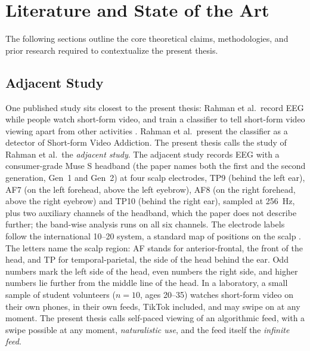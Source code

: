 \documentclass[12pt,a4paper]{report}
\begin{document}
\chapter{Literature and State of the Art}
\label{chap:literature}

The following sections outline the core theoretical claims, methodologies, and prior research required to contextualize the present thesis. 


\section{Adjacent Study}
\label{sec:adjacent_studies}
One published study sits closest to the present thesis: Rahman et al.\ record EEG while people watch short-form video, and train a classifier to tell short-form video viewing apart from other activities \cite{rahman_detection_2025}. Rahman et al.\ present the classifier as a detector of Short-form Video Addiction. The present thesis calls the study of Rahman et al.\ the \emph{adjacent study}. The adjacent study records EEG with a consumer-grade Muse S headband (the paper names both the first and the second generation, Gen~1 and Gen~2) at four scalp electrodes, TP9 (behind the left ear), AF7 (on the left forehead, above the left eyebrow), AF8 (on the right forehead, above the right eyebrow) and TP10 (behind the right ear), sampled at 256~Hz, plus two auxiliary channels of the headband, which the paper does not describe further; the band-wise analysis runs on all six channels. The electrode labels follow the international 10--20 system, a standard map of positions on the scalp \cite{moontaha_online_2023-1}. The letters name the scalp region: AF stands for anterior-frontal, the front of the head, and TP for temporal-parietal, the side of the head behind the ear. Odd numbers mark the left side of the head, even numbers the right side, and higher numbers lie further from the middle line of the head. In a laboratory, a small sample of student volunteers ($n=10$, ages 20--35) watches short-form video on their own phones, in their own feeds, TikTok included, and may swipe on at any moment. The present thesis calls self-paced viewing of an algorithmic feed, with a swipe possible at any moment, \textit{naturalistic use}, and the feed itself the \emph{infinite feed}.
\end{document}
